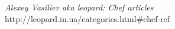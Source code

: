 \begin{thebibliography}{9}

  \emph{Alexey Vasiliev aka leopard: Chef articles}
  http://leopard.in.ua/categories.html\#chef-ref

\end{thebibliography}